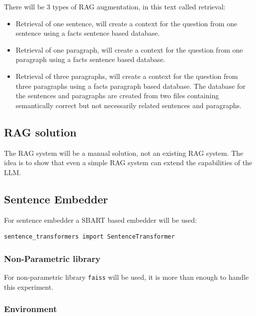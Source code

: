 \documentclass{wseas}
\begin{document}
There will be 3 types of RAG augmentation, in this text called
retrieval:

\begin{itemize}

\item
  Retrieval of one sentence, will create a context for the question from
  one sentence using a facts sentence based database.
\item
  Retrieval of one paragraph, will create a context for the question
  from one paragraph using a facts sentence based database.
\item
  Retrieval of three paragraphs, will create a context for the question
  from three paragraphs using a facts paragraph based database. The
  database for the sentences and paragraphs are created from two files
  containing semantically correct but not necessarily related sentences
  and paragraphs.
\end{itemize}

\newpage

\subsection{RAG solution}

The RAG system will be a manual solution, not an existing RAG system.
The idea is to show that even a simple RAG system can extend the
capabilities of the LLM.

\subsection{Sentence Embedder}

For sentence embedder a SBART based embedder will be used:

\begin{verbatim}
sentence_transformers import SentenceTransformer
\end{verbatim}

\subsubsection{Non-Parametric library}

For non-parametric library \texttt{faiss} will be used, it is more than
enough to handle this experiment.

\subsubsection{Environment}
\end{document}
